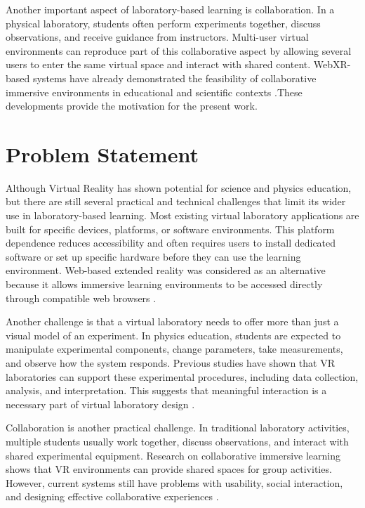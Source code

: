 Another important aspect of laboratory-based learning is collaboration. In a physical laboratory, students often perform experiments together, discuss observations, and receive guidance from instructors. Multi-user virtual environments can reproduce part of this collaborative aspect by allowing several users to enter the same virtual space and interact with shared content. WebXR-based systems have already demonstrated the feasibility of collaborative immersive environments in educational and scientific contexts \cite{cortes2024molecularwebxr}.These developments provide the motivation for the present work. 


\section{Problem Statement}

Although Virtual Reality has shown potential for science and physics education, but there are still several practical and technical challenges that limit its wider use in laboratory-based learning. Most existing virtual laboratory applications are built for specific devices, platforms, or software environments. This platform dependence reduces accessibility and often requires users to install dedicated software or set up specific hardware before they can use the learning environment. Web-based extended reality was considered as an alternative because it allows immersive learning environments to be accessed directly through compatible web browsers \cite{zatarain2022experiences}.

Another challenge is that a virtual laboratory needs to offer more than just a visual model of an experiment. In physics education, students are expected to manipulate experimental components, change parameters, take measurements, and observe how the system responds. Previous studies have shown that VR laboratories can support these experimental procedures, including data collection, analysis, and interpretation. This suggests that meaningful interaction is a necessary part of virtual laboratory design \cite{lakka2023online}.

Collaboration is another practical challenge. In traditional laboratory activities, multiple students usually work together, discuss observations, and interact with shared experimental equipment. Research on collaborative immersive learning shows that VR environments can provide shared spaces for group activities. However, current systems still have problems with usability, social interaction, and designing effective collaborative experiences \cite{paulsen2024collaborative}.

